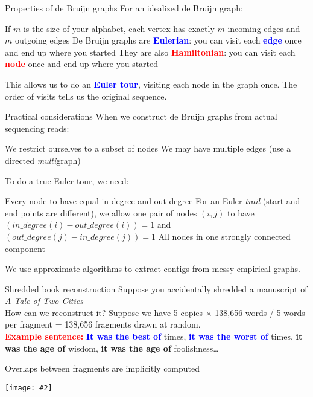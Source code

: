 \documentclass{beamer}
\renewcommand{\c}[1]{\begin{center}#1\end{center}}
\newcommand{\blu}[1]{\textcolor{blue}{\textbf{#1}}}
\newcommand{\red}[1]{\textcolor{red}{\textbf{#1}}}
\newcommand{\grn}[1]{\textcolor{dark-green}{\textbf{#1}}}
\newcommand{\gr}[2][.95]{\c{\texttt{[image: \#2]}}}
\begin{document}
\begin{frame}{Properties of de Bruijn graphs}
For an idealized de Bruijn graph:
    \begin{outline}
        \1 If $m$ is the size of your alphabet, each vertex has exactly $m$ incoming edges and $m$ outgoing edges
        \1 De Bruijn graphs are \blu{Eulerian}: you can visit each \blu{edge} once and end up where you started
        \1 They are also \red{Hamiltonian}: you can visit each \red{node} once and end up where you started
    \end{outline}
    This allows us to do an \blu{Euler tour}, visiting each node in the graph once. The order of visits tells us the original sequence.
\end{frame}

\begin{frame}{Practical considerations}
When we construct de Bruijn graphs from actual sequencing reads:
\begin{outline}
    \1 We restrict ourselves to a subset of nodes
    \1 We may have multiple edges (use a directed \textit{multi}graph)
\end{outline}
To do a true Euler tour, we need:
\begin{outline}
    \1 Every node to have equal in-degree and out-degree
        \2 For an Euler \textit{trail} (start and end points are different), we allow one pair of nodes $(i, j)$ to have $(in\_degree(i)  - out\_degree(i)) = 1$ and $(out\_degree(j) - in\_degree(j)) = 1$
    \1 All nodes in one strongly connected component
\end{outline}
We use approximate algorithms to extract contigs from messy empirical graphs.
\end{frame}

\begin{frame}{Shredded book reconstruction}
Suppose you accidentally shredded a manuscript of \textit{A Tale of Two Cities}\\
\bigskip
How can we reconstruct it? Suppose we have 5 copies $\times$ 138,656 words / 5 words per fragment = 138,656 fragments drawn at random.\\
\bigskip
\red{Example sentence:} \blu{It was the best of} times, \blu{it was the worst of} times, \grn{it was the age of} wisdom, \grn{it was the age of} foolishness\ldots
\end{frame}

\begin{frame}{Overlaps between fragments are implicitly computed}
\gr{l4_figs/s17_twocities.png}
\end{frame}
\end{document}
